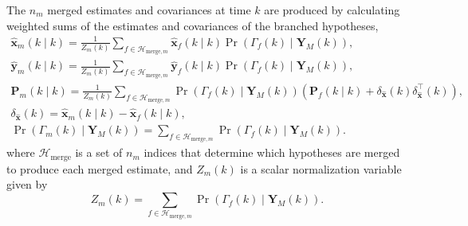 {{The $n_m$ merged estimates and covariances at time $k$ are produced by calculating weighted sums of the estimates and covariances of the branched hypotheses,
%
%
%
%
%
\begin{equation} \label{eq:xmkymk_hat_MKF}
	\begin{aligned}
		\mathbf{\hat{x}}_m(k \mid k) = \frac{1}{Z_m(k)} \sum_{f \in \mathcal{H}_{\text{merge},m}} \mathbf{\hat{x}}_f(k \mid k) \Pr(\Gamma_f(k) \mid \mathbf{Y}_M(k)), \\
		\mathbf{\hat{y}}_m(k \mid k) = \frac{1}{Z_m(k)} \sum_{f \in \mathcal{H}_{\text{merge},m}} \mathbf{\hat{y}}_f(k \mid k) \Pr(\Gamma_f(k) \mid \mathbf{Y}_M(k)),\\
		\mathbf{P}_m(k \mid k) = \frac{1}{Z_m(k)} \sum_{f \in \mathcal{H}_{\text{merge},m}} \Pr(\Gamma_f(k) \mid \mathbf{Y}_M(k)) \left( \mathbf{P}_f(k \mid k) + \delta_\mathbf{\hat{x}}(k) \delta_\mathbf{\hat{x}}^\intercal(k) \right), \\
		\delta_\mathbf{\hat{x}}(k) = \mathbf{\hat{x}}_m(k \mid k) - \mathbf{\hat{x}}_f(k \mid k), \\
		\Pr(\Gamma_m(k) \mid \mathbf{Y}_M(k)) = \sum_{f \in \mathcal{H}_{\text{merge},m}} \Pr(\Gamma_f(k) \mid \mathbf{Y}_M(k)).
	\end{aligned}
\end{equation}
%
where $\mathcal{H}_{\text{merge}}$ is a set of $n_m$ indices that determine which hypotheses are merged to produce each merged estimate, and $Z_m(k)$ is a scalar normalization variable given by
%
\begin{equation} \label{eq:Zmk}
	Z_m(k) = \sum_{f \in \mathcal{H}_{\text{merge},m}} \Pr(\Gamma_f(k) \mid \mathbf{Y}_M(k)).
\end{equation}

}}
